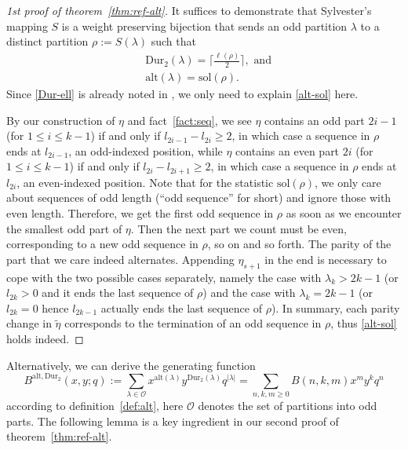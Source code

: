 \documentclass[11pt,reqno]{amsart}
\numberwithin{equation}{section}
\theoremstyle{plain}
\theoremstyle{definition}
\theoremstyle{named}
\newcommand{\abs}[1]{\left|#1\right|}
\def\cO{\mathcal{O}}
\def\la{\lambda}
\def\sol{\mathrm{sol}}
\def\Dur{\mathrm{Dur}}
\def\alt{\mathrm{alt}}
\begin{document}
\begin{proof}[1st proof of theorem~\ref{thm:ref-alt}]
It suffices to demonstrate that Sylvester's mapping $S$ is a weight preserving bijection that sends an odd partition $\la$ to a distinct partition $\rho:=S(\la)$ such that
\begin{align}
& \Dur_2(\la)=\lceil\frac{\ell(\rho)}{2}\rceil, \text{ and}\label{Dur-ell}\\
& \alt(\la)=\sol(\rho).\label{alt-sol}
\end{align}
Since \eqref{Dur-ell} is already noted in \cite[Prop.~2.2(i)]{bes94}, we only need to explain \eqref{alt-sol} here. 

By our construction of $\eta$ and fact~\ref{fact:seq}, we see $\eta$ contains an odd part $2i-1$ (for $1\le i\le k-1$) if and only if $l_{2i-1}-l_{2i}\ge 2$, in which case a sequence in $\rho$ ends at $l_{2i-1}$, an odd-indexed position, while $\eta$ contains an even part $2i$ (for $1\le i\le k-1$) if and only if $l_{2i}-l_{2i+1}\ge 2$, in which case a sequence in $\rho$ ends at $l_{2i}$, an even-indexed position. Note that for the statistic $\sol(\rho)$, we only care about sequences of odd length (``odd sequence'' for short) and ignore those with even length. Therefore, we get the first odd sequence in $\rho$ as soon as we encounter the smallest odd part of $\eta$. Then the next part we count must be even, corresponding to a new odd sequence in $\rho$, so on and so forth. The parity of the part that we care indeed alternates. Appending $\eta_{s+1}$ in the end is necessary to cope with the two possible cases separately, namely the case with $\la_{k}>2k-1$ (or $l_{2k}>0$ and it ends the last sequence of $\rho$) and the case with $\la_k=2k-1$ (or $l_{2k}=0$ hence $l_{2k-1}$ actually ends the last sequence of $\rho$). In summary, each parity change in $\tilde{\eta}$ corresponds to the termination of an odd sequence in $\rho$, thus \eqref{alt-sol} holds indeed.
\end{proof}

Alternatively, we can derive the generating function 
$$B^{\alt,\Dur_2}(x,y;q):=\sum_{\la\in\cO}x^{\alt(\la)}y^{\Dur_2(\la)}q^{\abs{\la}}=\sum_{n,k,m\ge 0}B(n,k,m)x^my^kq^n$$
according to definition~\ref{def:alt}, here $\cO$ denotes the set of partitions into odd parts. The following lemma is a key ingredient in our second proof of theorem~\ref{thm:ref-alt}.
\end{document}
